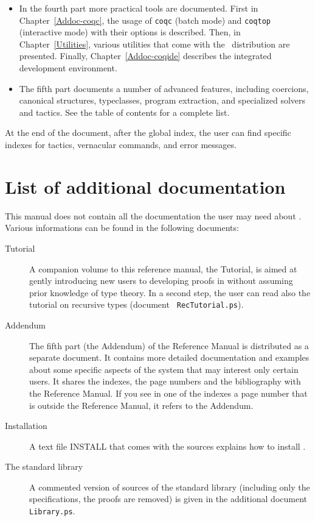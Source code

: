 \begin{itemize}
\item In the fourth part more practical tools are documented. First in
  Chapter~\ref{Addoc-coqc}, the usage of \texttt{coqc} (batch mode)
  and \texttt{coqtop} (interactive mode) with their options is
  described. Then, in Chapter~\ref{Utilities},
  various utilities that come with the \Coq\ distribution are
  presented.
  Finally, Chapter~\ref{Addoc-coqide} describes the \Coq{} integrated
  development environment. 

\item The fifth part documents a number of advanced features, including
  coercions, canonical structures, typeclasses, program extraction, and
  specialized solvers and tactics.  See the table of contents for a complete
  list.
\end{itemize}

At the end of the document, after the global index, the user can find
specific indexes for tactics, vernacular commands, and error
messages. 

\section*{List of additional documentation}

This manual does not contain all the documentation the user may need
about \Coq{}. Various informations can be found in the following
documents:  
\begin{description}

\item[Tutorial] 
  A companion volume to this reference manual, the \Coq{} Tutorial, is
  aimed at gently introducing new users to developing proofs in \Coq{}
  without assuming prior knowledge of type theory. In a second step, the
  user can read also the tutorial on recursive types (document {\tt
    RecTutorial.ps}).

\item[Addendum] The fifth part (the Addendum) of the Reference Manual
  is distributed as a separate document. It contains more
  detailed documentation and examples about some specific aspects of the
  system that may interest only certain users. It shares the indexes,
  the page numbers and
  the bibliography with the Reference Manual. If you see in one of the
  indexes a page number that is outside the Reference Manual, it refers
  to the Addendum. 

\item[Installation] A text file INSTALL that comes with the sources
  explains how to install \Coq{}.

\item[The \Coq{} standard library]
A commented version of sources of the \Coq{} standard library
(including only the specifications, the proofs are removed) 
is given in the additional document {\tt Library.ps}.

\end{description}


